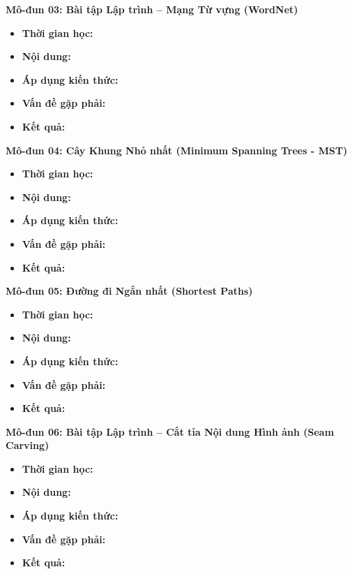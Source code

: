 \documentclass[11pt, a4paper]{article}
\begin{document}
\vspace{0.15cm}

\noindent\textbf{Mô-đun 03: Bài tập Lập trình -- Mạng Từ vựng (WordNet)}
\begin{itemize}
    \item \textbf{Thời gian học:} 
    \item \textbf{Nội dung:} 
    \item \textbf{Áp dụng kiến thức:} 
    \item \textbf{Vấn đề gặp phải:} 
    \item \textbf{Kết quả:} 
\end{itemize}

\vspace{0.15cm}

\noindent\textbf{Mô-đun 04: Cây Khung Nhỏ nhất (Minimum Spanning Trees - MST)}
\begin{itemize}
    \item \textbf{Thời gian học:} 
    \item \textbf{Nội dung:} 
    \item \textbf{Áp dụng kiến thức:} 
    \item \textbf{Vấn đề gặp phải:} 
    \item \textbf{Kết quả:} 
\end{itemize}

\vspace{0.15cm}

\noindent\textbf{Mô-đun 05: Đường đi Ngắn nhất (Shortest Paths)}
\begin{itemize}
    \item \textbf{Thời gian học:} 
    \item \textbf{Nội dung:} 
    \item \textbf{Áp dụng kiến thức:} 
    \item \textbf{Vấn đề gặp phải:} 
    \item \textbf{Kết quả:} 
\end{itemize}

\vspace{0.15cm}

\noindent\textbf{Mô-đun 06: Bài tập Lập trình -- Cắt tỉa Nội dung Hình ảnh (Seam Carving)}
\begin{itemize}
    \item \textbf{Thời gian học:} 
    \item \textbf{Nội dung:} 
    \item \textbf{Áp dụng kiến thức:} 
    \item \textbf{Vấn đề gặp phải:} 
    \item \textbf{Kết quả:} 
\end{itemize}
\end{document}
